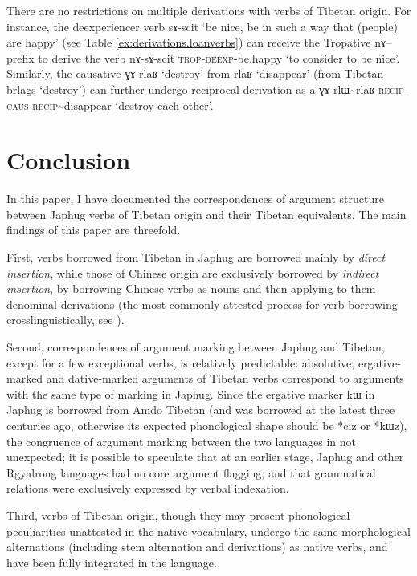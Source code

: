 \documentclass[oldfontcommands,oneside,a4paper,11pt]{article}
\newcommand{\ipa}[1]{{\phon \mbox{#1}}} %
\begin{document}
There are no restrictions on multiple derivations with verbs of Tibetan origin. For instance, the deexperiencer verb \ipa{sɤ-scit} `be nice, be in such a way that (people) are happy' (see Table \ref{ex:derivations.loanverbs}) can receive the Tropative \ipa{nɤ--} prefix to derive the verb \ipa{nɤ-sɤ-scit} \textsc{trop-deexp}-be.happy `to consider to be nice'. Similarly, the causative \ipa{ɣɤ-rlaʁ} `destroy' from \ipa{rlaʁ} `disappear' (from Tibetan \ipa{brlags} `destroy') can further undergo reciprocal derivation as  \ipa{a-ɣɤ-rlɯ\textasciitilde{}rlaʁ} \textsc{recip-caus-recip}\textasciitilde{}disappear `destroy each other'.
  
\section{Conclusion}
In this paper, I have documented the correspondences of argument structure between Japhug verbs of Tibetan origin and their Tibetan equivalents. The main findings of this paper are threefold.

First, verbs borrowed from Tibetan in Japhug are borrowed mainly by \textit{direct insertion}, while those of Chinese origin are exclusively borrowed by \textit{indirect insertion}, by borrowing Chinese verbs as nouns and then applying to them denominal derivations (the most commonly attested process for verb borrowing crosslinguistically, see \citealt{wohlgemuth09verbal}). 

Second, correspondences of argument marking between Japhug and Tibetan, except for a few exceptional verbs, is relatively predictable: absolutive, ergative-marked and dative-marked arguments of Tibetan verbs correspond to arguments with the same type of marking in Japhug. Since the ergative marker \ipa{kɯ} in Japhug is borrowed from Amdo Tibetan (and was borrowed at the latest three centuries ago, otherwise its expected phonological shape should be *\ipa{ciz} or *\ipa{kɯz}), the congruence of argument marking between the two languages in not unexpected; it is possible to speculate that at an earlier stage, Japhug and other Rgyalrong languages  had no core argument flagging, and that grammatical relations were exclusively expressed by verbal indexation.

Third, verbs of Tibetan origin, though they may present phonological peculiarities unattested in the native vocabulary, undergo the same morphological alternations (including stem alternation and derivations) as native verbs, and have been fully integrated in the language.





\end{document}
